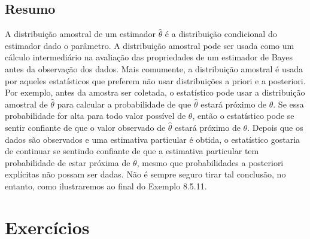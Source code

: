 \subsection*{Resumo}

A distribuição amostral de um estimador $\hat{\theta}$ é a distribuição condicional do estimador dado o parâmetro. A distribuição amostral pode ser usada como um cálculo intermediário na avaliação das propriedades de um estimador de Bayes antes da observação dos dados. Mais comumente, a distribuição amostral é usada por aqueles estatísticos que preferem não usar distribuições a priori e a posteriori. Por exemplo, antes da amostra ser coletada, o estatístico pode usar a distribuição amostral de $\hat{\theta}$ para calcular a probabilidade de que $\hat{\theta}$ estará próximo de $\theta$. Se essa probabilidade for alta para todo valor possível de $\theta$, então o estatístico pode se sentir confiante de que o valor observado de $\hat{\theta}$ estará próximo de $\theta$. Depois que os dados são observados e uma estimativa particular é obtida, o estatístico gostaria de continuar se sentindo confiante de que a estimativa particular tem probabilidade de estar próxima de $\theta$, mesmo que probabilidades a posteriori explícitas não possam ser dadas. Não é sempre seguro tirar tal conclusão, no entanto, como ilustraremos ao final do Exemplo 8.5.11.

\section*{Exercícios}

